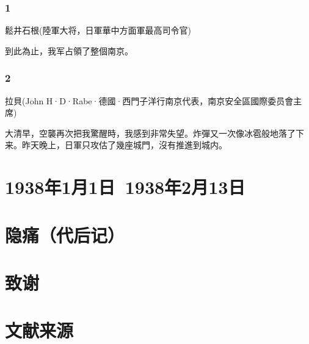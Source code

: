 \documentclass[12pt,UTF8]{ctexbook}
\begin{document}
\subsection{1}

鬆井石根(陸軍大将，日軍華中方面軍最高司令官)

到此為止，我军占領了整個南京。

\subsection{2}

拉貝(John H·D·Rabe·德國·西門子洋行南京代表，南京安全區國際委员會主席)

大清早，空襲再次把我驚醒時，我感到非常失望。炸彈又一次像冰雹般地落了下来。昨天晚上，日軍只攻估了幾座城門，沒有推進到城内。

\chapter{1938年1月1日~1938年2月13日}


\backmatter

\chapter{隐痛（代后记）}
\chapter{致谢}
\chapter{文献来源}
\end{document}
